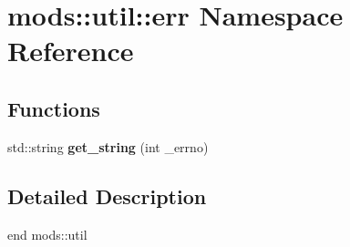 \hypertarget{namespacemods_1_1util_1_1err}{}\section{mods\+:\+:util\+:\+:err Namespace Reference}
\label{namespacemods_1_1util_1_1err}
\subsection*{Functions}
\begin{DoxyCompactItemize}
\item 
\mbox{\label{namespacemods_1_1util_1_1err_a34596e84a779889eeeb1c4740fdb2807}} 
std\+::string {\bfseries get\+\_\+string} (int \+\_\+errno)
\end{DoxyCompactItemize}


\subsection{Detailed Description}
end mods\+::util 